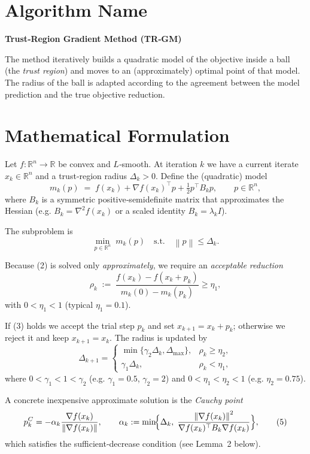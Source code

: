 \documentclass{article}
\newcommand{\norm}[1]{\left\lVert#1\right\rVert}
\newcommand{\R}{\mathbb{R}}
\begin{document}
\section*{Algorithm Name}
\textbf{Trust‑Region Gradient Method (TR‑GM)}  

The method iteratively builds a quadratic model of the objective inside a ball (the \emph{trust region}) and moves to an (approximately) optimal point of that model.  The radius of the ball is adapted according to the agreement between the model prediction and the true objective reduction.

\section*{Mathematical Formulation}
Let $f:\R^{n}\rightarrow\R$ be convex and $L$‑smooth.  
At iteration $k$ we have a current iterate $x_k\in\R^{n}$ and a trust‑region radius $\Delta_k>0$.  
Define the (quadratic) model
\[
m_k(p)\;=\;f(x_k)+\nabla f(x_k)^{\top}p+\tfrac12 p^{\top}B_k p,
\qquad p\in\R^{n},
\tag{1}
\]
where $B_k$ is a symmetric positive‑semidefinite matrix that approximates the Hessian
(e.g. $B_k = \nabla^{2}f(x_k)$ or a scaled identity $B_k = \lambda_k I$).  

The subproblem is
\[
\min_{p\in\R^{n}} \; m_k(p)\quad\text{s.t.}\quad \norm{p}\le \Delta_k .
\tag{2}
\]

Because (2) is solved only \emph{approximately}, we require an \emph{acceptable reduction}
\[
\rho_k \;:=\;
\frac{f(x_k)-f(x_k+p_k)}{m_k(0)-m_k(p_k)}\ge \eta_1,
\tag{3}
\]
with $0<\eta_1<1$ (typical $\eta_1=0.1$).  

If (3) holds we accept the trial step $p_k$ and set $x_{k+1}=x_k+p_k$; otherwise we reject it and keep $x_{k+1}=x_k$.  
The radius is updated by
\[
\Delta_{k+1}=
\begin{cases}
\min\{\gamma_2\Delta_k,\Delta_{\max}\}, & \rho_k\ge \eta_2,\\[4pt]
\gamma_1\Delta_k, & \rho_k<\eta_1,
\end{cases}
\tag{4}
\]
where $0<\gamma_1<1<\gamma_2$ (e.g. $\gamma_1=0.5$, $\gamma_2=2$) and $0<\eta_1<\eta_2<1$ (e.g. $\eta_2=0.75$).  

A concrete inexpensive approximate solution is the \emph{Cauchy point}
\[
p_k^{C}= -\alpha_k \frac{\nabla f(x_k)}{\norm{\nabla f(x_k)}},
\qquad
\alpha_k:=\min\!\Bigl\{\Delta_k,\;\frac{\norm{\nabla f(x_k)}^{2}}{\nabla f(x_k)^{\top}B_k\nabla f(x_k)}\Bigr\},
\tag{5}
\]
which satisfies the sufficient‑decrease condition (see Lemma~2 below).
\end{document}
